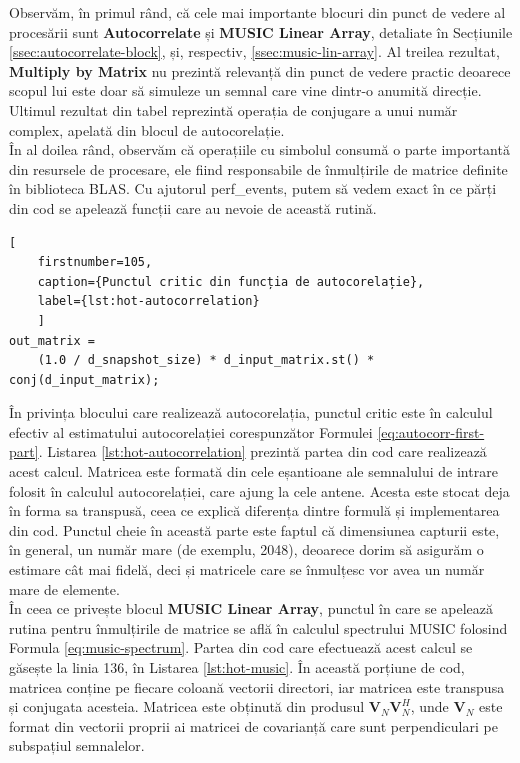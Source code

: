 Observăm, în primul rând, că cele mai importante blocuri din punct de vedere al
procesării sunt \textbf{Autocorrelate} și \textbf{MUSIC Linear Array}, detaliate
în Secțiunile \ref{ssec:autocorrelate-block}, și, respectiv,
\ref{ssec:music-lin-array}. Al treilea rezultat, \textbf{Multiply by Matrix} nu
prezintă relevanță din punct de vedere practic deoarece scopul lui este doar să
simuleze un semnal care vine dintr-o anumită direcție. Ultimul rezultat din
tabel reprezintă operația de conjugare a unui număr complex, apelată din blocul
de autocorelație. \\

În al doilea rând, observăm că operațiile cu simbolul  consumă o
parte importantă din resursele de procesare, ele fiind responsabile de
înmulțirile de matrice definite în biblioteca BLAS.  Cu ajutorul perf\_events,
putem să vedem exact în ce părți din cod se apelează funcții care au nevoie de
această rutină. \\

\begin{lstlisting}[
	firstnumber=105,
	caption={Punctul critic din funcția de autocorelație},
	label={lst:hot-autocorrelation}
    ]
out_matrix =
    (1.0 / d_snapshot_size) * d_input_matrix.st() * conj(d_input_matrix);
\end{lstlisting}

În privința blocului care realizează autocorelația, punctul critic este în
calculul efectiv al estimatului autocorelației corespunzător Formulei
\eqref{eq:autocorr-first-part}. Listarea \ref{lst:hot-autocorrelation} prezintă
partea din cod care realizează acest calcul. Matricea
 este formată din cele  eșantioane
ale semnalului de intrare folosit în calculul autocorelației, care ajung la cele
\newline
{} antene. Acesta este stocat deja în forma sa
transpusă, ceea ce explică diferența dintre formulă și implementarea din cod.
Punctul cheie în această parte este faptul că dimensiunea capturii este, în
general, un număr mare (de exemplu, 2048), deoarece dorim să asigurăm o estimare
cât mai fidelă, deci și matricele care se înmulțesc vor avea un număr mare de
elemente. \\

În ceea ce privește blocul \textbf{MUSIC Linear Array}, punctul în care se
apelează rutina pentru înmulțirile de matrice se află în calculul
spectrului MUSIC folosind Formula \eqref{eq:music-spectrum}. Partea din cod care
efectuează acest calcul se găsește la linia 136, în Listarea
\ref{lst:hot-music}. În această porțiune de cod, matricea 
conține pe fiecare coloană vectorii directori, iar matricea
 este transpusa și conjugata acesteia. Matricea
 este obținută din produsul $\bm{V}_N\bm{V}_N^H$, unde $\bm{V}_N$
este format din vectorii proprii ai matricei de covarianță care sunt
perpendiculari pe subspațiul semnalelor. \\

